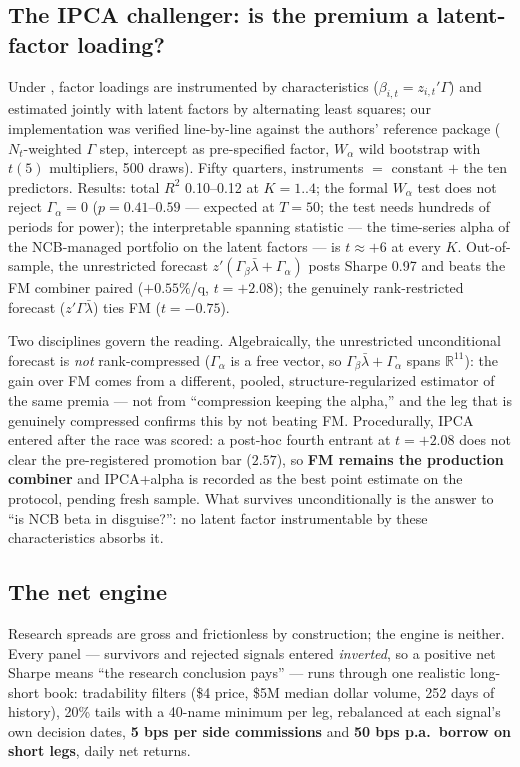 \subsection{The IPCA challenger: is the premium a latent-factor loading?}
\label{sec:ipca}

Under \citet{kps2019}, factor loadings are instrumented by
characteristics ($\beta_{i,t}=z_{i,t}'\Gamma$) and estimated jointly
with latent factors by alternating least squares; our implementation
was verified line-by-line against the authors' reference package
($N_t$-weighted $\Gamma$ step, intercept as pre-specified factor,
$W_\alpha$ wild bootstrap with $t(5)$ multipliers, 500 draws). Fifty
quarters, instruments $=$ constant $+$ the ten predictors. Results:
total $R^2$ 0.10--0.12 at $K=1..4$; the formal $W_\alpha$ test does
not reject $\Gamma_\alpha=0$ ($p=0.41$--$0.59$ --- expected at
$T=50$; the test needs hundreds of periods for power); the
interpretable spanning statistic --- the time-series alpha of the
NCB-managed portfolio on the latent factors --- is $t\approx+6$ at
every $K$. Out-of-sample, the unrestricted forecast
$z'(\Gamma_\beta\bar\lambda + \Gamma_\alpha)$ posts Sharpe 0.97 and
beats the FM combiner paired ($+0.55\%$/q, $t=+2.08$); the genuinely
rank-restricted forecast ($z'\Gamma\bar\lambda$) ties FM
($t=-0.75$).

Two disciplines govern the reading. Algebraically, the unrestricted
unconditional forecast is \emph{not} rank-compressed
($\Gamma_\alpha$ is a free vector, so
$\Gamma_\beta\bar\lambda+\Gamma_\alpha$ spans $\mathbb{R}^{11}$): the
gain over FM comes from a different, pooled, structure-regularized
estimator of the same premia --- not from ``compression keeping the
alpha,'' and the leg that is genuinely compressed confirms this by
not beating FM. Procedurally, IPCA entered after the race was
scored: a post-hoc fourth entrant at $t=+2.08$ does not clear the
pre-registered promotion bar ($2.57$), so \textbf{FM remains the
production combiner} and IPCA+alpha is recorded as the best point
estimate on the protocol, pending fresh sample. What survives
unconditionally is the answer to ``is NCB beta in disguise?'': no
latent factor instrumentable by these characteristics absorbs it.

\subsection{The net engine}
\label{sec:engine}

Research spreads are gross and frictionless by construction; the
engine is neither. Every panel --- survivors and rejected signals
entered \emph{inverted}, so a positive net Sharpe means ``the
research conclusion pays'' --- runs through one realistic long-short
book: tradability filters (\$4 price, \$5M median dollar volume, 252
days of history), 20\% tails with a 40-name minimum per leg,
rebalanced at each signal's own decision dates, \textbf{5 bps per
side commissions} and \textbf{50 bps p.a.\ borrow on short legs},
daily net returns.

